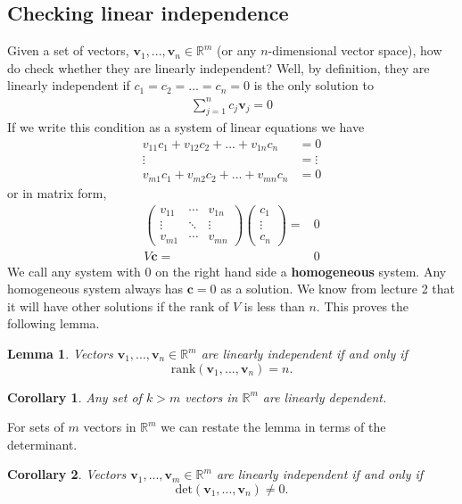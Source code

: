 \documentclass[12pt,reqno]{amsart}
\newtheorem{corollary}{Corollary}[section]
\newtheorem{lemma}{Lemma}[section]
\theoremstyle{definition}
\def\R{\mathbb{R}}
\newcommand{\gmatrix}[1]{\begin{pmatrix} {#1}_{11} & \cdots &
    {#1}_{1n} \\ \vdots & \ddots & \vdots \\ {#1}_{m1} & \cdots &
    {#1}_{mn} \end{pmatrix}}
\renewcommand{\det}{\mathrm{det}}
\newcommand{\rank}{\mathrm{rank}}
\begin{document}
\subsection{Checking linear independence}
Given a set of vectors, $\mathbf{v}_1, ..., \mathbf{v}_n \in \R^m$ (or
any $n$-dimensional vector space), how do check whether they are
linearly independent? Well, by definition, they are linearly
independent if $c_1 = c_2 = ... = c_n = 0$ is the only solution to
\begin{align*}
  \sum_{j=1}^n c_j \mathbf{v}_j = 0 
\end{align*}
If we write this condition as a system of linear equations we have
\begin{align*}
  v_{11} c_1 + v_{12} c_2 + ... + v_{1n} c_n & = 0 \\
  \vdots & = \vdots \\
  v_{m1} c_1 + v_{m2} c_2 + ... + v_{mn} c_n & = 0 
\end{align*}
or in matrix form,
\begin{align*}
  \gmatrix{v} \begin{pmatrix} c_1 \\ \vdots \\ c_n \end{pmatrix} = &
  0 \\
  V \mathbf{c} = & 0 
\end{align*}
We call any system with $0$ on the right hand side a
\textbf{homogeneous} system. Any homogeneous system always has
$\mathbf{c}=0$ as a solution. We know from lecture 2 that it will have
other solutions if the rank of $V$ is less than $n$. This proves the
following lemma.
\begin{lemma}\label{lem:rankli}
  Vectors $\mathbf{v}_1, ..., \mathbf{v}_n \in \R^m$ are linearly
  independent if and only if
  \[ \rank(\mathbf{v}_1, ..., \mathbf{v}_n) = n. \]
\end{lemma}
\begin{corollary}\label{cor:kmli}
  Any set of $k>m$ vectors in $\R^m$ are linearly dependent.
\end{corollary}
For sets of $m$ vectors in $\R^m$ we can restate the lemma in terms of
the determinant.
\begin{corollary}\label{cor:detli}
  Vectors $\mathbf{v}_1, ..., \mathbf{v}_m \in \R^m$ are linearly
  independent if and only if
  \[ \det(\mathbf{v}_1, ..., \mathbf{v}_n) \neq 0. \]
\end{corollary}
\end{document}
